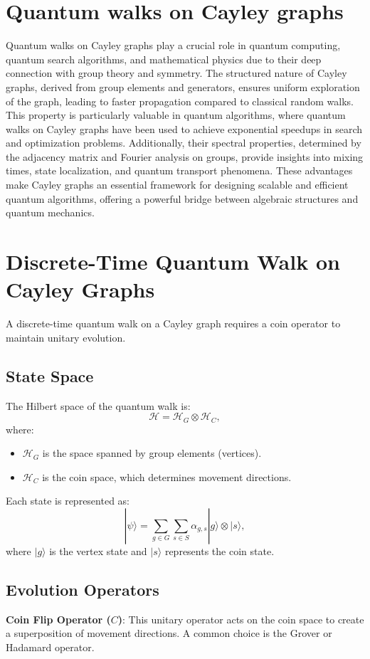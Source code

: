 \documentclass[11pt]{article}
\theoremstyle{definition}
\begin{document}
\section*{Quantum walks on Cayley graphs}
Quantum walks on Cayley graphs play a crucial role in quantum computing, quantum search algorithms, and mathematical physics due to their deep connection with group theory and symmetry. The structured nature of Cayley graphs, derived from group elements and generators, ensures uniform exploration of the graph, leading to faster propagation compared to classical random walks. This property is particularly valuable in quantum algorithms, where quantum walks on Cayley graphs have been used to achieve exponential speedups in search and optimization problems. Additionally, their spectral properties, determined by the adjacency matrix and Fourier analysis on groups, provide insights into mixing times, state localization, and quantum transport phenomena. These advantages make Cayley graphs an essential framework for designing scalable and efficient quantum algorithms, offering a powerful bridge between algebraic structures and quantum mechanics.




\section*{Discrete-Time Quantum Walk on Cayley Graphs}

A discrete-time quantum walk on a Cayley graph requires a coin operator to maintain unitary evolution.

\subsection*{State Space}
The Hilbert space of the quantum walk is:
\[
\mathcal{H} = \mathcal{H}_G \otimes \mathcal{H}_C,
\]
where:
\begin{itemize}
    \item \( \mathcal{H}_G \) is the space spanned by group elements (vertices).
    \item \( \mathcal{H}_C \) is the coin space, which determines movement directions.
\end{itemize}

Each state is represented as:
\[
|\psi\rangle = \sum_{g \in G} \sum_{s \in S} \alpha_{g,s} |g\rangle \otimes |s\rangle,
\]
where \( |g\rangle \) is the vertex state and \( |s\rangle \) represents the coin state.

\subsection*{Evolution Operators}
\textbf{Coin Flip Operator (\( C \))}: This unitary operator acts on the coin space to create a superposition of movement directions. A common choice is the Grover or Hadamard operator.
\end{document}
